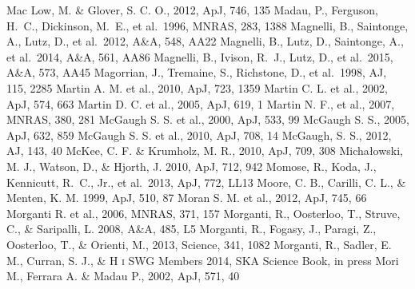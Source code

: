 \begin{thebibliography}{99}
\begin{multicols}{2}
{
	Mac Low, M. \& Glover, S. C. O., 2012, ApJ, 746, 135
	Madau, P., Ferguson, H.~C., Dickinson, M.~E., et al.\ 1996, MNRAS, 283, 1388 
	Magnelli, B., Saintonge, A., Lutz, D., et al.\ 2012, A\&A, 548, AA22 
	Magnelli, B., Lutz, D., Saintonge, A., et al.\ 2014, A\&A, 561, AA86 
	Magnelli, B., Ivison, R.~J., Lutz, D., et al.\ 2015, A\&A, 573, AA45 
	Magorrian, J., Tremaine, S., Richstone, D., et al.\ 1998, AJ, 115, 2285 
	Martin A. M. et al., 2010, ApJ, 723, 1359
	Martin C. L. et al., 2002, ApJ, 574, 663
	Martin D. C. et al., 2005, ApJ, 619, 1
	Martin N. F., et al., 2007, MNRAS, 380, 281
	McGaugh S. S. et al., 2000, ApJ, 533, 99
	McGaugh S. S., 2005, ApJ, 632, 859
	McGaugh S. S. et al., 2010, ApJ, 708, 14
	McGaugh, S. S., 2012, AJ, 143, 40
	McKee, C. F. \& Krumholz, M. R., 2010, ApJ, 709, 308
    	Micha{\l}owski, M. J., Watson, D., \& Hjorth, J. 2010, ApJ, 712, 942
	Momose, R., Koda, J., Kennicutt, R.~C., Jr., et al.\ 2013, ApJ, 772, LL13 
    	Moore, C. B., Carilli, C. L., \& Menten, K. M. 1999, ApJ, 510, 87
	Moran S. M. et al., 2012, ApJ, 745, 66
	Morganti R. et al., 2006, MNRAS, 371, 157
    	Morganti, R., Oosterloo, T., Struve, C., \& Saripalli, L. 2008, A\&A, 485, L5
    	Morganti, R., Fogasy, J., Paragi, Z., Oosterloo, T., \&  Orienti, M., 2013, Science, 341, 1082
    	Morganti, R., Sadler, E. M., Curran, S. J., \& H \textsc{i} SWG Members
    	2014, SKA Science Book, in press
	Mori M., Ferrara A. \& Madau P., 2002, ApJ, 571, 40
}
\end{multicols}
\end{thebibliography}
